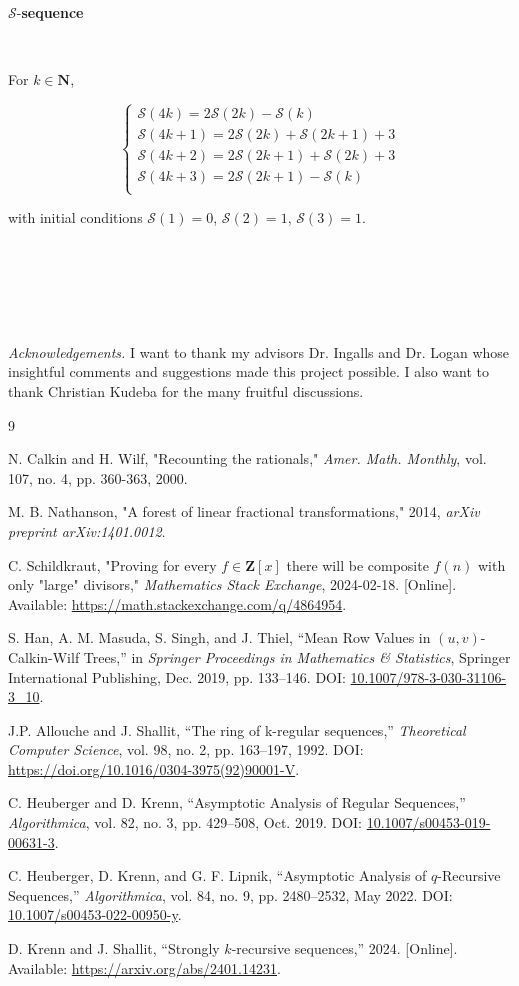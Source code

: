 \documentclass{article}
\begin{document}
$\mathcal{S}$-\textbf{sequence}

\

For $k \in \mathbf{N}$,

$$
\begin{cases}
\mathcal{S}(4k) = 2\mathcal{S}(2k) - \mathcal{S}(k) \\
\mathcal{S}(4k+1) = 2\mathcal{S}(2k) + \mathcal{S}(2k+1) + 3 \\
\mathcal{S}(4k+2) =  2\mathcal{S}(2k+1) + \mathcal{S}(2k) + 3 \\
\mathcal{S}(4k+3) =  2\mathcal{S}(2k+1) - \mathcal{S}(k)  \\
\end{cases}
$$

with initial conditions $\mathcal{S}(1) = 0$, $\mathcal{S}(2) = 1$, $\mathcal{S}(3) = 1$.

\

\

\

\textit{Acknowledgements.} I want to thank my advisors Dr. Ingalls and Dr. Logan whose insightful comments and suggestions made this project possible. I also want to thank Christian Kudeba for the many fruitful discussions.

\begin{thebibliography}{9}

N. Calkin and H. Wilf, "Recounting the rationals," \textit{Amer. Math. Monthly}, vol. 107, no. 4, pp. 360-363, 2000.

M. B. Nathanson, "A forest of linear fractional transformations," 2014, \textit{arXiv preprint arXiv:1401.0012}.

C. Schildkraut, "Proving for every $f \in \mathbf{Z}[x]$ there will be composite $f(n)$ with only "large" divisors," \textit{Mathematics Stack Exchange}, 2024-02-18. [Online]. Available: \url{https://math.stackexchange.com/q/4864954}.

S. Han, A. M. Masuda, S. Singh, and J. Thiel, ``Mean Row Values in $(u, v)$-Calkin-Wilf Trees,'' in \emph{Springer Proceedings in Mathematics \& Statistics}, Springer International Publishing, Dec. 2019, pp. 133--146. DOI: \url{10.1007/978-3-030-31106-3_10}.

J.P. Allouche and J. Shallit, ``The ring of k-regular sequences,'' \emph{Theoretical Computer Science}, vol. 98, no. 2, pp. 163--197, 1992. DOI: \url{https://doi.org/10.1016/0304-3975(92)90001-V}.

C. Heuberger and D. Krenn, ``Asymptotic Analysis of Regular Sequences,'' \emph{Algorithmica}, vol. 82, no. 3, pp. 429--508, Oct. 2019. DOI: \url{10.1007/s00453-019-00631-3}.

C. Heuberger, D. Krenn, and G. F. Lipnik, ``Asymptotic Analysis of $q$-Recursive Sequences,'' \emph{Algorithmica}, vol. 84, no. 9, pp. 2480--2532, May 2022. DOI: \url{10.1007/s00453-022-00950-y}.

D. Krenn and J. Shallit, ``Strongly $k$-recursive sequences,'' 2024. [Online]. Available: \url{https://arxiv.org/abs/2401.14231}.

\end{thebibliography}
\end{document}
